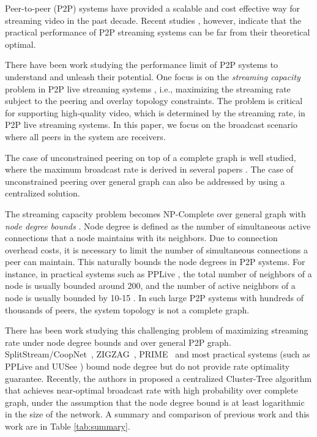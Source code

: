 \documentclass[10pt,conference]{IEEEtran}
\begin{document}
\label{sec:Intro}

Peer-to-peer (P2P) systems have provided a scalable and cost effective
way for streaming video in the past decade. Recent studies \cite{fenglili,AbeKirCig,wang2007r,zhang2005coolstreaming},
however, indicate that the practical performance of P2P streaming
systems can be far from their theoretical optimal.

There have been work studying the performance limit of P2P systems
to understand and unleash their potential. One focus is on the \emph{streaming
capacity} problem \cite{streaming_capacity.allerton09} in P2P live streaming systems
, i.e., maximizing the streaming rate subject to the peering and overlay topology constraints.
The problem is critical for supporting high-quality video, which is
determined by the streaming rate, in P2P live streaming systems. In this paper, we
focus on the broadcast scenario where all peers in the system are
receivers.

The case of unconstrained peering on top of a complete graph is well
studied, where the maximum broadcast rate is derived in several papers
\cite{all:P2PStreaming:KLR.07,all:Mutualcast:LPZ05,all:NetCodP2P:CYHF.06,massoulie2007rdb,chen2008ump}.
The case of unconstrained peering over general graph can also be addressed
by using a centralized solution\cite{sudipta2009lcclc}.

The streaming capacity problem becomes NP-Complete over general graph
with \emph{node degree bounds} \cite{streaming_capacity.icdcs10}.
Node degree is defined as the number of simultaneous active connections that a node maintains with its neighbors. Due to connection overhead costs, it is necessary
to limit the number of simultaneous connections a peer can maintain.
This naturally bounds the node degrees in P2P systems. For instance, in practical
systems such as PPLive \cite{all:pplive}, the total number of neighbors of
a node is usually bounded around 200, and the number
of active neighbors of a node is usually bounded by 10-15 \cite{streaming_capacity.allerton09}. In such large P2P systems with hundreds of thousands of peers, the system topology is not a complete graph.

There has been work studying this challenging problem of maximizing streaming rate under node degree bounds and over general P2P graph. SplitStream/CoopNet~\cite{castro2003shb,padmanabhan2002ccn},
ZIGZAG~\cite{zigzag}, PRIME~\cite{magharei2009prime} and most
practical systems (such as PPLive \cite{all:pplive} and UUSee \cite{all:uusee})
bound node degree but do not provide rate optimality guarantee. Recently,
the authors in \cite{streaming_capacity.icdcs10} proposed a centralized
Cluster-Tree algorithm that achieves near-optimal broadcast rate with
high probability over complete graph, under the assumption that the
node degree bound is at least logarithmic in the size of the network. A summary
and comparison of previous work and this work are in Table \ref{tab:summary}.
\end{document}
